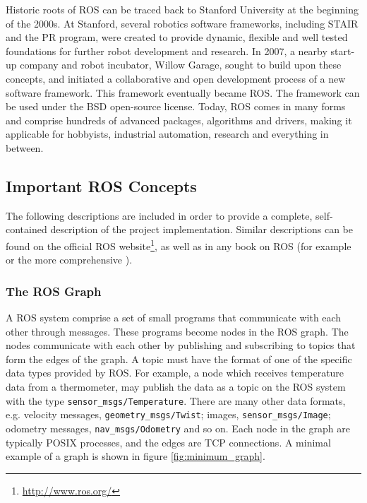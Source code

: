 Historic roots of \ac{ROS} can be traced back to Stanford University at the beginning of the 2000s. At Stanford, several robotics software frameworks, including \ac{STAIR} and the \ac{PR} program, were created to provide dynamic, flexible and well tested foundations for further robot development and research. In 2007, a nearby start-up company and robot incubator, Willow Garage, sought to build upon these concepts, and initiated a collaborative and open development process of a new software framework. This framework eventually became \ac{ROS}\cite{ROS_history}\cite{rosbook15}. The framework can be used under the BSD open-source license\cite{BCD_license}. Today, \ac{ROS} comes in many forms and comprise hundreds of advanced packages, algorithms and drivers, making it applicable for hobbyists, industrial automation, research and everything in between. 

\subsection{Important ROS Concepts}
\label{sec:ros_concepts}
The following descriptions are included in order to provide a complete, self-contained description of the project implementation. Similar descriptions can be found on the official \ac{ROS} website\footnote{\url{http://www.ros.org/}}, as well as in any book on \ac{ROS} (for example \cite{rosbook15} or the more comprehensive \cite{koubaa2016robot}). 

\subsubsection{The ROS Graph}

A \ac{ROS} system comprise a set of small programs that communicate with each other through messages. These programs become nodes in the \ac{ROS} graph. The nodes communicate with each other by publishing and subscribing to topics that form the edges of the graph. A topic must have the format of one of the specific data types provided by \ac{ROS}. For example, a node which receives temperature data from a thermometer, may publish the data as a topic on the \ac{ROS} system with the type \texttt{sensor\_msgs/Temperature}. There are many other data formats, e.g. velocity messages, \texttt{geometry\_msgs/Twist}; images, \texttt{sensor\_msgs/Image}; odometry messages, \texttt{nav\_msgs/Odometry} and so on. Each node in the graph are typically POSIX processes, and the edges are TCP connections\cite{rosbook15}. A minimal example of a graph is shown in figure \ref{fig:minimum_graph}.

